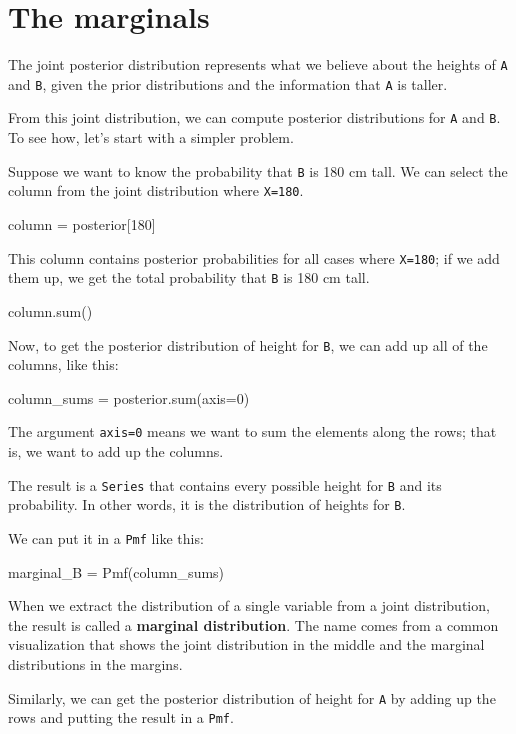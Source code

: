 \documentclass[12pt]{book}
\theoremstyle{exercise}
\newcommand{\py}[1]{{\tt #1}}%
\begin{document}
\section{The marginals}
\label{marginals}

The joint posterior distribution represents what we believe about the heights of \py{A} and \py{B}, given the prior distributions and the information that \py{A} is taller.

From this joint distribution, we can compute posterior distributions for \py{A} and \py{B}.  To see how, let's start with a simpler problem.

Suppose we want to know the probability that \py{B} is 180 cm tall.  We can select the column from the joint distribution where \py{X=180}.

\begin{code}
column = posterior[180]
\end{code}

This column contains posterior probabilities for all cases where \py{X=180}; if we add them up, we get the total probability that \py{B} is 180 cm tall.

\begin{code}
column.sum()
\end{code}

Now, to get the posterior distribution of height for \py{B}, we can add up all of the columns, like this:

\begin{code}
column_sums = posterior.sum(axis=0)
\end{code}

The argument \py{axis=0} means we want to sum the elements along the rows; that is, we want to add up the columns.

The result is a \py{Series} that contains every possible height for \py{B} and its probability.  In other words, it is the distribution of heights for \py{B}.

We can put it in a \py{Pmf} like this:

\begin{code}
marginal_B = Pmf(column_sums)
\end{code}

When we extract the distribution of a single variable from a joint distribution, the result is called a {\bf marginal distribution}.
The name comes from a common visualization that shows the joint distribution in the middle and the marginal distributions in the margins.

Similarly, we can get the posterior distribution of height for \py{A} by adding up the rows and putting the result in a \py{Pmf}.
\end{document}
